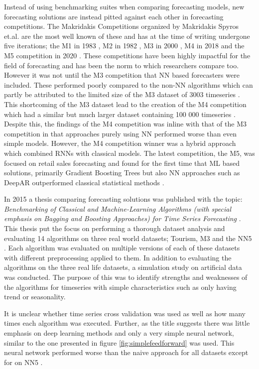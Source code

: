 Instead of using benchmarking suites when comparing forecasting models, new forecasting solutions are instead pitted against each other in forecasting competitions. The Makridakis Competitions organized by Makridakis Spyros et.al. are the most well known of these and has at the time of writing undergone five iterations; the M1 in 1983 \cite{makridakis1987confidence}, M2 in 1982 \cite{makridakis1993m2}, M3 in 2000 \cite{m3_competition}, M4 in 2018 \cite{makridakis_m4_2020} and the M5 competition in 2020 \cite{m5}. These competitions have been highly impactful for the field of forecasting and has been the norm to which researchers compare too. However it was not until the M3 competition that NN based forecasters were included. These performed poorly compared to the non-NN algorithms which can partly be attributed to the limited size of the M3 dataset of 3003 timeseries \cite{m3_competition}. This shortcoming of the M3 dataset lead to the creation of the M4 competition which had a similar but much larger dataset containing 100 000 timeseries \cite{makridakis_m4_2020}. Despite this, the findings of the M4 competition was inline with that of the M3 competition in that approaches purely using NN performed worse than even simple models. However, the M4 competition winner was a hybrid approach which combined RNNs with classical models. The latest competition, the M5, was focused on retail sales forecasting and found for the first time that ML based solutions, primarily Gradient Boosting Trees but also NN approaches such as DeepAR outperformed classical statistical methods \cite{m5}.

In 2015 a thesis comparing forecasting solutions was published with the topic: \textit{Benchmarking of Classical and Machine-Learning Algorithms (with special emphasis on Bagging and Boosting Approaches) for Time Series Forecasting} \cite{other_thesis}. This thesis put the focus on performing a thorough dataset analysis and evaluating 14 algorithms on three real world datasets; Tourism, M3 and the NN5 \cite{NN5_website}. Each algorithm was evaluated on multiple versions of each of these datasets with different preprocessing applied to them. In addition to evaluating the algorithms on the three real life datasets, a simulation study on artificial data was conducted. The purpose of this was to identify strengths and weaknesses of the algorithms for timeseries with simple characteristics such as only having trend or seasonality.

It is unclear whether time series cross validation was used as well as how many times each algorithm was executed. Further, as the title suggests there was little emphasis on deep learning methods and only a very simple neural network, similar to the one presented in figure \ref{fig:simplefeedforward} was used. This neural network performed worse than the naive approach for all datasets except for on NN5 \cite{other_thesis}.



